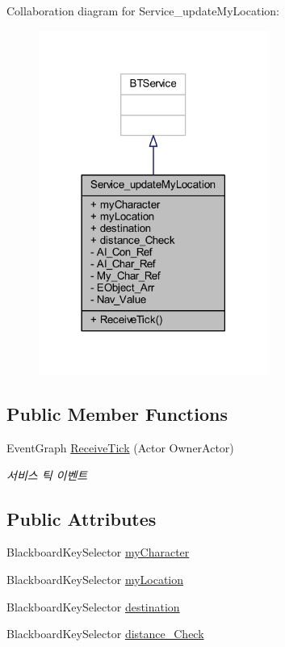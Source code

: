 Collaboration diagram for Service\+\_\+update\+My\+Location\+:\nopagebreak
\begin{figure}[H]
\begin{center}
\leavevmode
\includegraphics[width=213pt]{class_service__update_my_location__coll__graph}
\end{center}
\end{figure}
\subsection*{Public Member Functions}
\begin{DoxyCompactItemize}
\item 
Event\+Graph \hyperlink{class_service__update_my_location_a2c2f90d92234520772c3a0108f148626}{Receive\+Tick} (Actor Owner\+Actor)
\begin{DoxyCompactList}\small\item\em 서비스 틱 이벤트 \end{DoxyCompactList}\end{DoxyCompactItemize}
\subsection*{Public Attributes}
\begin{DoxyCompactItemize}
\item 
Blackboard\+Key\+Selector \hyperlink{class_service__update_my_location_af65a492f86eb3082328f78c249981ac4}{my\+Character}
\item 
Blackboard\+Key\+Selector \hyperlink{class_service__update_my_location_acaa12f248f236e8068516533751daae4}{my\+Location}
\item 
Blackboard\+Key\+Selector \hyperlink{class_service__update_my_location_aeda83c71d6edf61186416547abacf575}{destination}
\item 
Blackboard\+Key\+Selector \hyperlink{class_service__update_my_location_a585e2ac19aed8fd8807fd9f0ef987825}{distance\+\_\+\+Check}
\end{DoxyCompactItemize}
